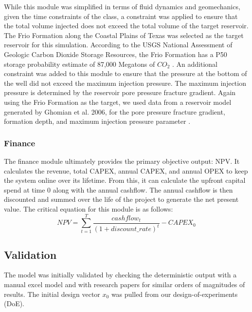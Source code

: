 \documentclass[balance,upint,subscriptcorrection,varvw,mathalfa=cal=boondoxo,spanish,french,vietnamese,russian,greek,pdf-a,colorlinks]{asmeconf}
\begin{document}
While this module was simplified in terms of fluid dynamics and geomechanics, given the time constraints of the class, a constraint was applied to ensure that the total volume injected does not exceed the total volume of the target reservoir. The Frio Formation along the Coastal Plains of Texas was selected as the target reservoir for this simulation. According to the USGS National Assessment of Geologic Carbon Dioxide Storage Resources, the Frio Formation has a P50 storage probability estimate of 87,000 Megatons of $CO_{2}$ \cite{USGS2013}. An additional constraint was added to this module to ensure that the pressure at the bottom of the well did not exceed the maximum injection pressure. The maximum injection pressure is determined by the reservoir pore pressure fracture gradient. Again using the Frio Formation as the target, we used data from a reservoir model generated by Ghomian et al. 2006, for the pore pressure fracture gradient, formation depth, and maximum injection pressure parameter \cite{ghomian_reservoir_2008}. 

\subsubsection{Finance}
The finance module ultimately provides the primary objective output: NPV. It calculates the revenue, total CAPEX, annual CAPEX, and annual OPEX to keep the system online over its lifetime. From this, it can calculate the upfront capital spend at time 0 along with the annual cashflow. The annual cashflow is then discounted and summed over the life of the project to generate the net present value. The critical equation for this module is as follows:
\begin{equation}
    NPV = \sum_{t=1}^{T} \frac{cashflow_t}{(1+discount\_rate)^t} - CAPEX_0
\end{equation}

\subsection{Validation}

The model was initially validated by checking the deterministic output with a manual excel model and with research papers for similar orders of magnitudes of results. The initial design vector \begin{math}{x_0} \end{math} was pulled from our design-of-experiments (DoE).
\end{document}
